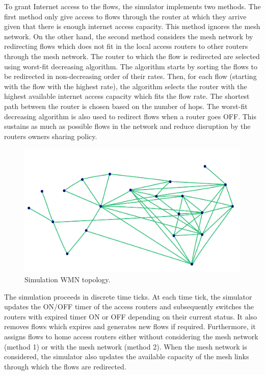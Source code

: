 To grant Internet access to the flows, the simulator implements two methods. The first method only give access to flows through the router at which they arrive given that there is enough internet access capacity. This method ignores the mesh network. On the other hand, the second method considers the mesh network by redirecting flows which does not fit in the local access routers to other routers through the mesh network. The router to which the flow is redirected are selected using worst-fit decreasing algorithm. The algorithm starts by sorting the flows to be redirected in non-decreasing order of their rates. Then, for each flow (starting with the flow with the highest rate), the algorithm selects the router with the highest available internet access capacity which fits the flow rate. The shortest path between the router is chosen based on the number of hops. The worst-fit decreasing algorithm is also used to redirect flows when a router goes OFF. This sustains as much as possible flows in the network and reduce disruption by the routers owners sharing policy.

\begin{figure}[t]
\begin{center}
\includegraphics[width=1\linewidth]{topology.pdf}
\caption{Simulation WMN topology.}
\label{fig:topology}
\end{center}
\end{figure}

The simulation proceeds in discrete time ticks. At each time tick, the simulator updates the ON/OFF timer of the access routers and subsequently switches the routers with expired timer ON or OFF depending on their current status. It also removes flows which expires and generates new flows if required. Furthermore, it assigns flows to home access routers either without considering the mesh network (method 1) or with the mesh network (method 2). When the mesh network is considered, the simulator also updates the available capacity of the mesh links through which the flows are redirected.

